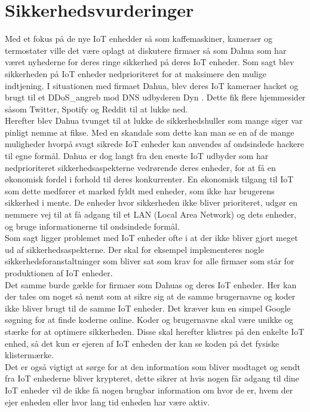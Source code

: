 \section{Sikkerhedsvurderinger}

    Med et fokus på de nye IoT enhedder så som kaffemaskiner, kameraer og termostater ville det være oplagt at diskutere firmaer så som Dahua som har været nyhederne for deres ringe sikkerhed på deres IoT enheder. Som sagt blev sikkerheden på IoT enheder nedprioriteret for at maksimere den mulige indtjening. I situationen med firmaet Dahua, blev deres IoT kameraer hacket og brugt til et \Gls{DDoS_angreb} mod DNS udbyderen Dyn \autocite{MotherboardVice}. Dette fik flere hjemmesider såsom Twitter, Spotify og Reddit til at lukke ned. \\ 
    Herefter blev Dahua tvunget til at lukke de sikkerhedshuller som mange siger var pinligt nemme at fikse. Med en skandale som dette kan man se en af de mange muligheder hvorpå svagt sikrede IoT enheder kan anvendes af ondsindede hackere til egne formål. Dahua er dog langt fra den eneste IoT udbyder som har nedprioriteret sikkerhedsaspekterne vedrørende deres enheder, for at få en økonomisk fordel i forhold til deres konkurrenter. En økonomisk tilgang til IoT som dette medfører et marked fyldt med enheder, som ikke har brugerens sikkerhed i mente. De enheder hvor sikkerheden ikke bliver prioriteret, udgør en nemmere vej til at få adgang til et LAN (Local Area Network) og dets enheder, og bruge informationerne til ondsindede formål.  \autocite{Androidauthority}\\
    Som sagt ligger problemet med IoT enheder ofte i at der ikke bliver gjort meget ud af sikkerhedsaspekterne. Der skal for eksempel implementeres nogle sikkerhedsforanstaltninger som bliver sat som krav for alle firmaer som står for produktionen af IoT enheder.\\ 
    Det samme burde gælde for firmaer som Dahuas og deres IoT enheder. 
    Her kan der tales om noget så nemt som at sikre sig at de samme brugernavne og koder ikke bliver brugt til de samme IoT enheder. Det kræver kun en simpel Google søgning for at finde koderne online. Koder og brugernavne skal være unikke og stærke for at optimere sikkerheden. Disse skal herefter klistres på den enkelte IoT enhed, så det kun er ejeren af IoT enheden der kan se koden på det fysiske klistermærke. \\ 
    Det er også vigtigt at sørge for at den information som bliver modtaget og sendt fra IoT enhederne bliver krypteret, dette sikrer at hvis nogen får adgang til dine IoT enheder vil de ikke få nogen brugbar information om hvor de er, hvem der ejer enheden eller hvor lang tid enheden har være aktiv.\\

